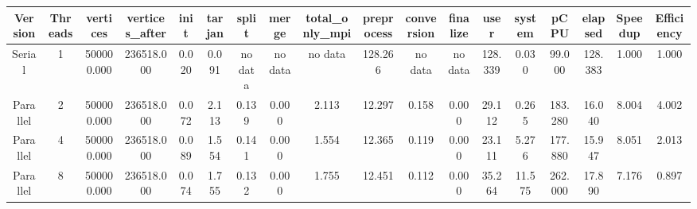 \begin{tabular}{|c|c|c|c|c|c|c|c|c|c|c|c|c|c|c|c|c|c|}
\toprule
 Version &  Threads &   vertices &  vertices\_after &  init &  tarjan &   split &   merge & total\_only\_mpi &  preprocess & conversion & finalize &    user &  system &    pCPU &  elapsed &  Speedup &  Efficiency \\
\midrule
  Serial &        1 & 500000.000 &      236518.000 & 0.020 &   0.091 & no data & no data &        no data &     128.266 &    no data &  no data & 128.339 &   0.030 &  99.000 &  128.383 &    1.000 &       1.000 \\
Parallel &        2 & 500000.000 &      236518.000 & 0.072 &   2.113 &   0.139 &   0.000 &          2.113 &      12.297 &      0.158 &    0.000 &  29.112 &   0.265 & 183.280 &   16.040 &    8.004 &       4.002 \\
Parallel &        4 & 500000.000 &      236518.000 & 0.089 &   1.554 &   0.141 &   0.000 &          1.554 &      12.365 &      0.119 &    0.000 &  23.111 &   5.276 & 177.880 &   15.947 &    8.051 &       2.013 \\
Parallel &        8 & 500000.000 &      236518.000 & 0.074 &   1.755 &   0.132 &   0.000 &          1.755 &      12.451 &      0.112 &    0.000 &  35.264 &  11.575 & 262.000 &   17.890 &    7.176 &       0.897 \\
\bottomrule
\end{tabular}

